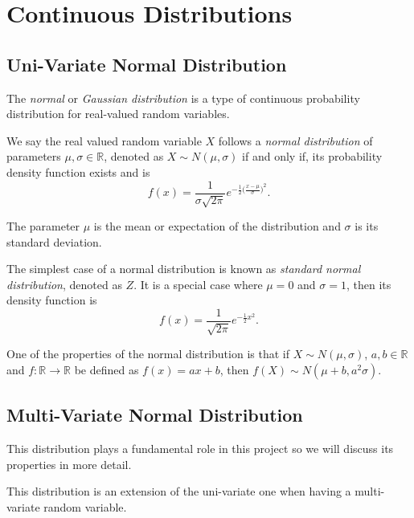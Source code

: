 \section{Continuous Distributions}

\subsection*{Uni-Variate Normal Distribution}

The \emph{normal} or \emph{Gaussian distribution} is a type of continuous
probability distribution for real-valued random variables.

\begin{definition}
  We say the real valued random variable \(X\) follows a \emph{normal distribution} of
  parameters \(\mu, \sigma \in \mathbb{R}\), denoted as \(X \sim N(\mu,
  \sigma)\) if and only if, its probability density function exists and is
  \[
    f(x) = \frac{1}{\sigma \sqrt{2\pi}} e^{-\frac{1}{2}\big(\frac{x-\mu}{\sigma} \big)^2}.
  \]

  The parameter \(\mu\) is the mean or expectation of the distribution and
  \(\sigma\) is its standard deviation.

\end{definition}

The simplest case of a normal distribution is known as \emph{standard normal
  distribution}, denoted as \(Z\). It is a special case where \(\mu = 0\) and \(\sigma = 1\), then
its density function is
\[
  f(x) = \frac{1}{\sqrt{2\pi}}e^{-\frac{1}{2}x^2}.
\]

One of the properties of the normal distribution is that if \(X \sim N(\mu, \sigma)\), \(a,b \in \mathbb{R}\) and \(f:\mathbb{R} \to \mathbb{R}\) be defined
as \(f(x) = ax + b\), then \(f(X) \sim N(\mu + b, a^2 \sigma)\).

\subsection*{Multi-Variate Normal Distribution}

This distribution plays a fundamental role in this project so we will discuss
its properties in more detail.

This distribution is an extension of the uni-variate one when having a
multi-variate random variable.

